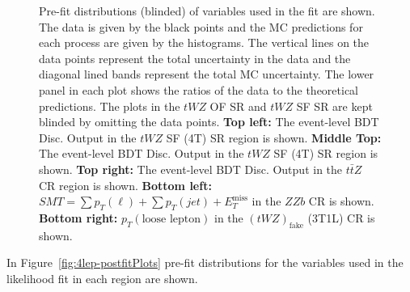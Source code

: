 \begin{figure}[htbp]
        \caption{Pre-fit distributions (blinded) of variables used in the fit are shown. The data is given by the black points and the MC predictions for each process are given by the histograms. The vertical lines on the data points represent the total uncertainty in the data and the diagonal lined bands represent the total MC uncertainty. The lower panel in each plot shows the ratios of the data to the theoretical predictions. The plots in the $tWZ$ OF SR and $tWZ$ SF SR are kept blinded by omitting the data points. \textbf{Top left:} The event-level BDT Disc. Output in the $tWZ$ SF (4T) SR region is shown. \textbf{Middle Top:} The event-level BDT Disc. Output in the $tWZ$ SF (4T) SR region is shown. \textbf{Top right:} The event-level BDT Disc. Output in the $t\bar{t}Z$ CR region is shown. \textbf{Bottom left:} $SMT = \sum p_{T} (\ell) + \sum p_{T} (jet) + E_{T}^{\text{miss}}$ in the $ZZb$ CR is shown. \textbf{Bottom right:} $p_{T}(\text{loose lepton})$ in the $(tWZ)_{\text{fake}}$ (3T1L) CR is shown.}
  \label{fig:4lep-prefitPlots}
\end{figure}


In Figure~\ref{fig:4lep-postfitPlots} pre-fit distributions for the variables used in the likelihood fit in each region are shown.

